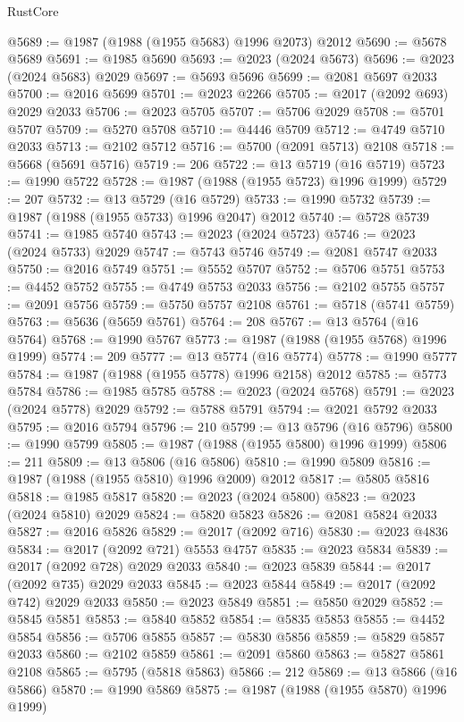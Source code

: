 \begin{lexlean}{RustCore}
\begin{coremodule}
@5689 := @1987 (@1988 (@1955 @5683) @1996 @2073) @2012
@5690 := @5678 @5689
@5691 := @1985 @5690
@5693 := @2023 (@2024 @5673)
@5696 := @2023 (@2024 @5683) @2029
@5697 := @5693 @5696
@5699 := @2081 @5697 @2033
@5700 := @2016 @5699
@5701 := @2023 @2266
@5705 := @2017 (@2092 @693) @2029 @2033
@5706 := @2023 @5705
@5707 := @5706 @2029
@5708 := @5701 @5707
@5709 := @5270 @5708
@5710 := @4446 @5709
@5712 := @4749 @5710 @2033
@5713 := @2102 @5712
@5716 := @5700 (@2091 @5713) @2108
@5718 := @5668 (@5691 @5716)
@5719 := 206
@5722 := @13 @5719 (@16 @5719)
@5723 := @1990 @5722
@5728 := @1987 (@1988 (@1955 @5723) @1996 @1999)
@5729 := 207
@5732 := @13 @5729 (@16 @5729)
@5733 := @1990 @5732
@5739 := @1987 (@1988 (@1955 @5733) @1996 @2047) @2012
@5740 := @5728 @5739
@5741 := @1985 @5740
@5743 := @2023 (@2024 @5723)
@5746 := @2023 (@2024 @5733) @2029
@5747 := @5743 @5746
@5749 := @2081 @5747 @2033
@5750 := @2016 @5749
@5751 := @5552 @5707
@5752 := @5706 @5751
@5753 := @4452 @5752
@5755 := @4749 @5753 @2033
@5756 := @2102 @5755
@5757 := @2091 @5756
@5759 := @5750 @5757 @2108
@5761 := @5718 (@5741 @5759)
@5763 := @5636 (@5659 @5761)
@5764 := 208
@5767 := @13 @5764 (@16 @5764)
@5768 := @1990 @5767
@5773 := @1987 (@1988 (@1955 @5768) @1996 @1999)
@5774 := 209
@5777 := @13 @5774 (@16 @5774)
@5778 := @1990 @5777
@5784 := @1987 (@1988 (@1955 @5778) @1996 @2158) @2012
@5785 := @5773 @5784
@5786 := @1985 @5785
@5788 := @2023 (@2024 @5768)
@5791 := @2023 (@2024 @5778) @2029
@5792 := @5788 @5791
@5794 := @2021 @5792 @2033
@5795 := @2016 @5794
@5796 := 210
@5799 := @13 @5796 (@16 @5796)
@5800 := @1990 @5799
@5805 := @1987 (@1988 (@1955 @5800) @1996 @1999)
@5806 := 211
@5809 := @13 @5806 (@16 @5806)
@5810 := @1990 @5809
@5816 := @1987 (@1988 (@1955 @5810) @1996 @2009) @2012
@5817 := @5805 @5816
@5818 := @1985 @5817
@5820 := @2023 (@2024 @5800)
@5823 := @2023 (@2024 @5810) @2029
@5824 := @5820 @5823
@5826 := @2081 @5824 @2033
@5827 := @2016 @5826
@5829 := @2017 (@2092 @716)
@5830 := @2023 @4836
@5834 := @2017 (@2092 @721) @5553 @4757
@5835 := @2023 @5834
@5839 := @2017 (@2092 @728) @2029 @2033
@5840 := @2023 @5839
@5844 := @2017 (@2092 @735) @2029 @2033
@5845 := @2023 @5844
@5849 := @2017 (@2092 @742) @2029 @2033
@5850 := @2023 @5849
@5851 := @5850 @2029
@5852 := @5845 @5851
@5853 := @5840 @5852
@5854 := @5835 @5853
@5855 := @4452 @5854
@5856 := @5706 @5855
@5857 := @5830 @5856
@5859 := @5829 @5857 @2033
@5860 := @2102 @5859
@5861 := @2091 @5860
@5863 := @5827 @5861 @2108
@5865 := @5795 (@5818 @5863)
@5866 := 212
@5869 := @13 @5866 (@16 @5866)
@5870 := @1990 @5869
@5875 := @1987 (@1988 (@1955 @5870) @1996 @1999)

\end{coremodule}
\end{lexlean}
